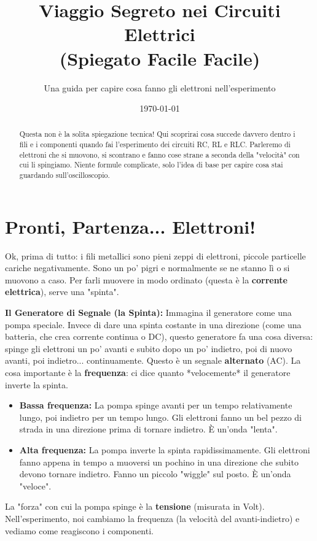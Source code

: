 \documentclass[a4paper, 11pt]{article}
\title{Viaggio Segreto nei Circuiti Elettrici \\ (Spiegato Facile Facile)}
\author{Una guida per capire cosa fanno gli elettroni nell'esperimento}
\date{\today}
\begin{document}
\maketitle

\begin{abstract}
Questa non è la solita spiegazione tecnica! Qui scoprirai cosa succede davvero dentro i fili e i componenti quando fai l'esperimento dei circuiti RC, RL e RLC. Parleremo di elettroni che si muovono, si scontrano e fanno cose strane a seconda della "velocità" con cui li spingiamo. Niente formule complicate, solo l'idea di base per capire cosa stai guardando sull'oscilloscopio.
\end{abstract}

\section*{Pronti, Partenza... Elettroni!}

Ok, prima di tutto: i fili metallici sono pieni zeppi di elettroni, piccole particelle cariche negativamente. Sono un po' pigri e normalmente se ne stanno lì o si muovono a caso. Per farli muovere in modo ordinato (questa è la \textbf{corrente elettrica}), serve una "spinta".

\textbf{Il Generatore di Segnale (la Spinta):}
Immagina il generatore come una pompa speciale. Invece di dare una spinta costante in una direzione (come una batteria, che crea corrente continua o DC), questo generatore fa una cosa diversa: spinge gli elettroni un po' avanti e subito dopo un po' indietro, poi di nuovo avanti, poi indietro... continuamente. Questo è un segnale \textbf{alternato} (AC).
La cosa importante è la \textbf{frequenza}: ci dice quanto *velocemente* il generatore inverte la spinta.
\begin{itemize}
    \item \textbf{Bassa frequenza:} La pompa spinge avanti per un tempo relativamente lungo, poi indietro per un tempo lungo. Gli elettroni fanno un bel pezzo di strada in una direzione prima di tornare indietro. È un'onda "lenta".
    \item \textbf{Alta frequenza:} La pompa inverte la spinta rapidissimamente. Gli elettroni fanno appena in tempo a muoversi un pochino in una direzione che subito devono tornare indietro. Fanno un piccolo "wiggle" sul posto. È un'onda "veloce".
\end{itemize}
La "forza" con cui la pompa spinge è la \textbf{tensione} (misurata in Volt). Nell'esperimento, noi cambiamo la frequenza (la velocità del avanti-indietro) e vediamo come reagiscono i componenti.
\end{document}
